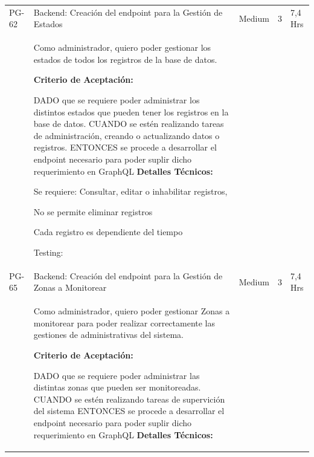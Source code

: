 \documentclass[11pt]{charter}
\begin{document}
\begin{landscape}
\begin{tabularx}{\linewidth}{@{}|p{1.3cm}|p{17cm}|p{1.7cm}|p{1.5cm}|p{1.7cm}|@{}}
PG-62    & Backend: Creación del endpoint   para la Gestión de Estados        & Medium             & 3   & 7,4  Hrs          \\
         &  \begin{description}                 
                   \item Como administrador, quiero poder   gestionar los estados de todos los registros de la base de datos.                 
                   \item \textbf{Criterio de Aceptación:}                 
                   \item DADO que se requiere poder administrar los distintos estados que pueden   tener los registros en la base de datos. CUANDO se estén realizando tareas de administración, creando o actualizando   datos o registros. ENTONCES se procede a desarrollar el endpoint necesario para poder suplir dicho requerimiento en GraphQL                           
                   \textbf{Detalles Técnicos:} 
                         \item Se requiere: Consultar, editar o inhabilitar registros, 
                         \item No se permite eliminar registros 
                         \item Cada registro es dependiente del tiempo                 
                   \item Testing:                 
            \end{description} &  &     & \\
PG-65    & Backend: Creación del endpoint   para la Gestión de Zonas a Monitorear               & Medium             & 3   & 7,4  Hrs          \\
         &  \begin{description}                 
                   \item Como administrador, quiero poder   gestionar Zonas a monitorear para poder realizar correctamente las gestiones   de administrativas del sistema.                 
                   \item \textbf{Criterio de Aceptación:}                 
                   \item DADO que se requiere poder administrar las distintas zonas que pueden ser   monitoreadas. CUANDO se estén realizando tareas de supervición del sistema ENTONCES se procede a desarrollar el endpoint necesario para poder suplir dicho requerimiento en GraphQL                              
                   \textbf{Detalles Técnicos:} 

\end{description}
\end{tabularx}
\end{landscape}
\end{document}
